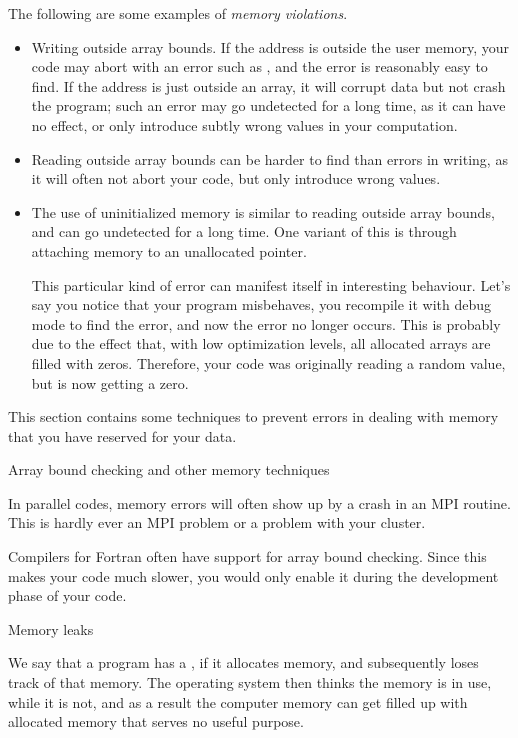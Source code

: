 The following are some examples of \emph{memory violations}.
\begin{itemize}
\item Writing outside array bounds. If the address is outside the user
  memory, your code may abort with an error such as
  , and the error is reasonably easy
  to find. If the address is just outside an array, it will corrupt
  data but not crash the program; such an error may go undetected for
  a long time, as it can have no effect, or only introduce subtly
  wrong values in your computation.
\item Reading outside array bounds can be harder to find than errors
  in writing, as it will often not abort your code, but only introduce
  wrong values.
\item The use of uninitialized memory is similar to reading outside
  array bounds, and can go undetected for a long time. One variant of
  this is through attaching memory to an unallocated pointer.

  This particular kind of error can manifest itself in interesting
  behaviour. Let's say you notice that your program misbehaves, you
  recompile it with debug mode to find the error, and now the error no
  longer occurs. This is probably due to the effect that, with low
  optimization levels, all allocated arrays are filled with
  zeros. Therefore, your code was originally reading a random value,
  but is now getting a zero.
\end{itemize}

This section contains some
techniques to prevent errors in dealing with memory that you have
reserved for your data.

 {Array bound checking and other memory techniques}

In parallel codes, memory errors will often show up by a crash in an
MPI routine. This is hardly ever an MPI problem or a problem with your
cluster.

Compilers for  Fortran often have support for array bound
checking. Since this makes your code much slower, you would only
enable it during the development phase of your code.

 {Memory leaks}

We say that a program has a , if it allocates
memory, and subsequently loses track of that memory. The operating
system then thinks the memory is in use, while it is not, and as a
result the computer memory can get filled up with allocated memory
that serves no useful purpose.

